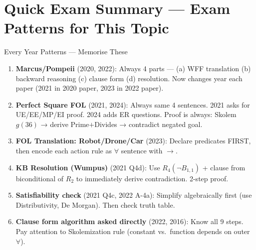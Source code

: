 \documentclass[12pt,a4paper]{article}
\begin{document}
\newpage
\section*{Quick Exam Summary --- Exam Patterns for This Topic}

\begin{warnbox}{Every Year Patterns --- Memorise These}
\begin{enumerate}[noitemsep]
  \item \textbf{Marcus/Pompeii} (2020, 2022): Always 4 parts --- (a) WFF translation (b) backward reasoning (c) clause form (d) resolution. Now changes year each paper (2021 in 2020 paper, 2023 in 2022 paper).
  \item \textbf{Perfect Square FOL} (2021, 2024): Always same 4 sentences. 2021 asks for UE/EE/MP/EI proof. 2024 adds ER questions. Proof is always: Skolem $g(36)$ → derive Prime$+$Divides → contradict negated goal.
  \item \textbf{FOL Translation: Robot/Drone/Car} (2023): Declare predicates FIRST, then encode each action rule as $\forall$ sentence with $\rightarrow$.
  \item \textbf{KB Resolution (Wumpus)} (2021 Q4d): Use $R_4(\neg B_{1,1})$ + clause from biconditional of $R_2$ to immediately derive contradiction. 2-step proof.
  \item \textbf{Satisfiability check} (2021 Q4c, 2022 A-4a): Simplify algebraically first (use Distributivity, De Morgan). Then check truth table.
  \item \textbf{Clause form algorithm asked directly} (2022, 2016): Know all 9 steps. Pay attention to Skolemization rule (constant vs.\ function depends on outer $\forall$).
\end{enumerate}
\end{warnbox}
\end{document}

